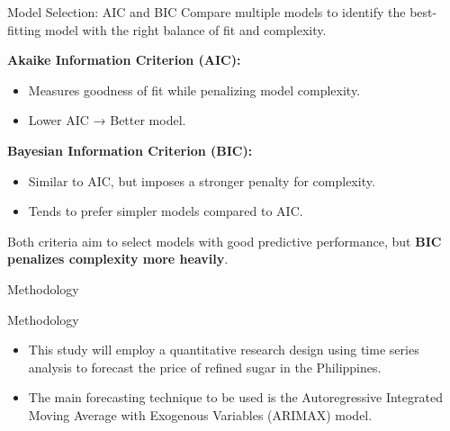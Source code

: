 \documentclass[12pt, aspectratio=169]{beamer}
\begin{document}
\begin{frame}{Model Selection: AIC and BIC}
    Compare multiple models to identify the best-fitting model with the right balance of fit and complexity.
    
    \vspace{0.3cm}
    \textbf{Akaike Information Criterion (AIC):}
    \begin{itemize}
        \item Measures goodness of fit while penalizing model complexity.
        \item Lower AIC → Better model.
    \end{itemize}

    \vspace{0.2cm}
    \textbf{Bayesian Information Criterion (BIC):}
    \begin{itemize}
        \item Similar to AIC, but imposes a stronger penalty for complexity.
        \item Tends to prefer simpler models compared to AIC.
    \end{itemize}
    
    \vspace{0.2cm}
    Both criteria aim to select models with good predictive performance, but \textbf{BIC penalizes complexity more heavily}.
\end{frame}




\begin{frame}
    \begin{tcolorbox}[colframe=theme, colback=theme]
        \begin{center}
            \Huge{Methodology}
        \end{center}
    \end{tcolorbox}
\end{frame}

\begin{frame}{Methodology}
    \begin{itemize}
        \item     This study will employ a quantitative research design using time series analysis to forecast the price of refined sugar in the Philippines.
        \item The main forecasting technique to be used is the Autoregressive Integrated Moving Average with Exogenous Variables (ARIMAX) model.
    \end{itemize}
\end{frame}
\end{document}
